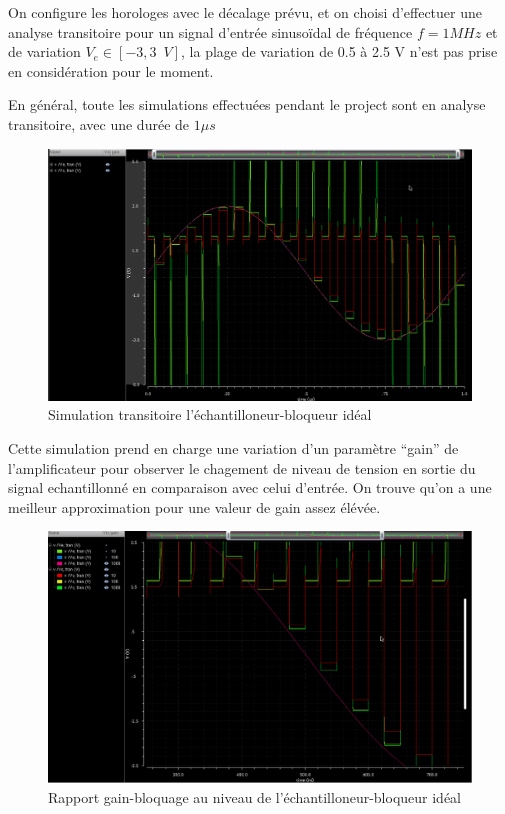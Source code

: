 \documentclass[11pt]{article}
\begin{document}
\clearpage

On configure les horologes avec le d\'ecalage pr\'evu, et on choisi d'effectuer
une analyse transitoire pour un signal d'entr\'ee sinuso\"idal de fr\'equence
$f = 1 MHz$ et de variation $V_e \in [-3, 3\phantom{1}V]$, la plage de variation
de 0.5 \`a 2.5 V n'est pas prise en consid\'eration pour le moment.

En g\'en\'eral, toute les simulations effectu\'ees pendant le project sont en analyse
transitoire, avec une dur\'ee de $1 \mu s$

\begin{figure}[!htb]
\begin{center}
  \includegraphics[width=0.8\linewidth]{simu_ech_bloqueur.png}
  \caption{Simulation transitoire l'\'echantilloneur-bloqueur id\'eal}
\end{center}
\end{figure}

Cette simulation prend en charge une variation d'un param\`etre ``gain'' de l'amplificateur
pour observer le chagement de niveau de tension en sortie du signal echantillonn\'e
en comparaison avec celui d'entr\'ee. On trouve qu'on a une meilleur approximation pour une
valeur de gain assez \'el\'ev\'ee.

\begin{figure}[!htb]
\begin{center}
  \includegraphics[width=0.8\linewidth]{rapport_gain_bloquage.png}
  \caption{Rapport gain-bloquage au niveau de l'\'echantilloneur-bloqueur id\'eal}
\end{center}
\end{figure}
\end{document}
